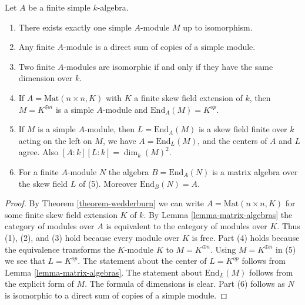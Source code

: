 \begin{lemma}
\label{lemma-simple-module-unique}
Let $A$ be a finite simple $k$-algebra.
\begin{enumerate}
\item There exists exactly one simple $A$-module $M$ up to isomorphism.
\item Any finite $A$-module is a direct sum of copies of a simple module.
\item Two finite $A$-modules are isomorphic if and only if they
have the same dimension over $k$.
\item If $A = \text{Mat}(n \times n, K)$ with $K$ a finite skew field
extension of $k$, then $M = K^{\oplus n}$ is a simple $A$-module and
$\text{End}_A(M) = K^{op}$.
\item If $M$ is a simple $A$-module, then $L = \text{End}_A(M)$
is a skew field finite over $k$ acting on the left on $M$, we have
$A = \text{End}_L(M)$, and the centers of $A$ and $L$ agree.
Also $[A : k] [L : k] = \dim_k(M)^2$.
\item For a finite $A$-module $N$ the algebra $B = \text{End}_A(N)$ is a
matrix algebra over the skew field $L$ of (5). Moreover $\text{End}_B(N) = A$.
\end{enumerate}
\end{lemma}

\begin{proof}
By
Theorem \ref{theorem-wedderburn}
we can write $A = \text{Mat}(n \times n, K)$ for some finite skew
field extension $K$ of $k$. By
Lemma \ref{lemma-matrix-algebras}
the category of modules over $A$ is equivalent to the category of
modules over $K$. Thus (1), (2), and (3) hold
because every module over $K$ is free. Part (4) holds
because the equivalence transforms the $K$-module $K$
to $M = K^{\oplus n}$. Using $M = K^{\oplus n}$ in (5)
we see that $L = K^{op}$. The statement about the center of $L = K^{op}$
follows from
Lemma \ref{lemma-matrix-algebras}.
The statement about $\text{End}_L(M)$ follows from the explicit form
of $M$. The formula of dimensions is clear.
Part (6) follows as $N$ is isomorphic to a direct sum of
copies of a simple module.
\end{proof}